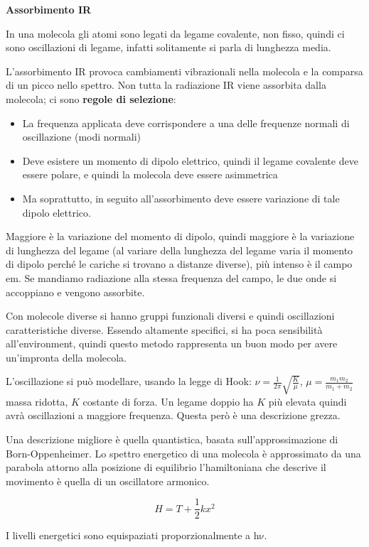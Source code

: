 \textbf{Assorbimento IR}

In una molecola gli atomi sono legati da legame covalente, non fisso,
quindi ci sono oscillazioni di legame, infatti solitamente si parla di
lunghezza media.

L'assorbimento IR provoca cambiamenti vibrazionali nella molecola e la
comparsa di un picco nello spettro. Non tutta la radiazione IR viene
assorbita dalla molecola; ci sono \textbf{regole di selezione}:

\begin{itemize}
\item
  La frequenza applicata deve corrispondere a una delle frequenze
  normali di oscillazione (modi normali)
\item
  Deve esistere un momento di dipolo elettrico, quindi il legame
  covalente deve essere polare, e quindi la molecola deve essere
  asimmetrica
\item
  Ma soprattutto, in seguito all'assorbimento deve essere variazione di
  tale dipolo elettrico.
\end{itemize}

Maggiore è la variazione del momento di dipolo, quindi maggiore è la
variazione di lunghezza del legame (al variare della lunghezza del
legame varia il momento di dipolo perché le cariche si trovano a
distanze diverse), più intenso è il campo em. Se mandiamo radiazione
alla stessa frequenza del campo, le due onde si accoppiano e vengono
assorbite.

Con molecole diverse si hanno gruppi funzionali diversi e quindi
oscillazioni caratteristiche diverse. Essendo altamente specifici, si ha
poca sensibilità all'environment, quindi questo metodo rappresenta un
buon modo per avere un'impronta della molecola.

L'oscillazione si può modellare, usando la legge di Hook:
\(\nu = \frac{1}{2\pi}\sqrt{\frac{K}{\mu}}\),
\(\mu = \frac{m_{1}m_{2}}{m_{1} + m_{2}}\) massa ridotta, \(K\) costante
di forza. Un legame doppio ha \(K\) più elevata quindi avrà oscillazioni
a maggiore frequenza. Questa però è una descrizione grezza.

Una descrizione migliore è quella quantistica, basata
sull'approssimazione di Born-Oppenheimer. Lo spettro energetico di una
molecola è approssimato da una parabola attorno alla posizione di
equilibrio l'hamiltoniana che descrive il movimento è quella di un
oscillatore armonico.

\[H = T + \frac{1}{2}kx^{2}\]

I livelli energetici sono equispaziati proporzionalmente a
\(\text{hν}\).

